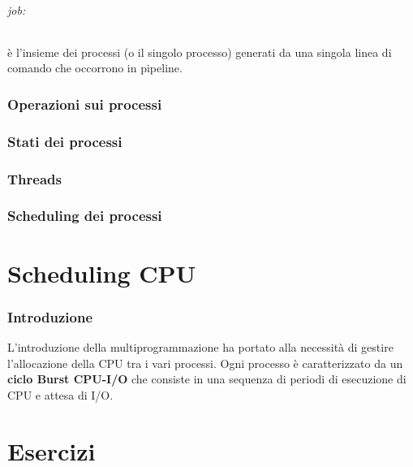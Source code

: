 \documentclass{article}
\begin{document}
\paragraph{job:} è l'insieme dei processi (o il singolo processo) generati da una singola linea di comando che occorrono in pipeline.
\section{Operazioni sui processi}
\section{Stati dei processi}
\section{Threads}
\section{Scheduling dei processi}







\part{Scheduling CPU} %
\section{Introduzione}
L'introduzione della multiprogrammazione ha portato alla necessità di gestire l'allocazione della CPU tra i vari processi.
Ogni processo è caratterizzato da un \textbf{ciclo Burst CPU-I/O} che consiste in una sequenza di periodi
di esecuzione di CPU e attesa di I/O.



\part{Esercizi}
\end{document}

